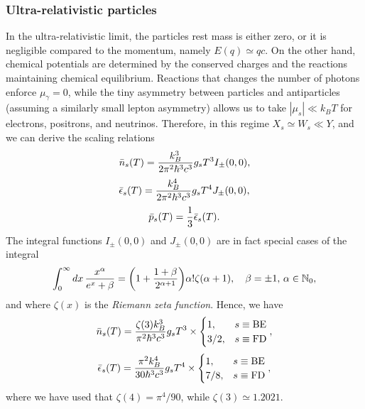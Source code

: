 \subsubsection{Ultra-relativistic particles}
In the ultra-relativistic limit, the particles rest mass is either zero, or it is negligible compared to the momentum, namely $E(q) \simeq qc$. On the other hand, chemical potentials are determined by the conserved charges and the reactions maintaining chemical equilibrium. Reactions that changes the number of photons enforce $\mu_\gamma = 0$, while the tiny asymmetry between particles and antiparticles (assuming a similarly small lepton asymmetry) allows us to take $|\mu_s| \ll k_BT$ for electrons, positrons, and neutrinos. Therefore, in this regime $X_s \simeq W_s \ll Y$, and we can derive the scaling relations
\begin{equation}
    \bar{n}_s(T) = \frac{k_B^3}{2\pi^2\hbar^3c^3}g_sT^3I_\pm(0,0),
\end{equation}
\begin{equation}
    \bar{\epsilon}_s(T) = \frac{k_B^4}{2\pi^2\hbar^3c^3}g_sT^4J_\pm(0,0),
\end{equation}
\begin{equation}
    \bar{p}_s(T) = \frac{1}{3}\bar{\epsilon}_s(T).
\end{equation}
The integral functions $I_\pm(0,0)$ and $J_\pm(0,0)$ are in fact special cases of the integral 
\begin{equation}
    \int_0^\infty dx\,\frac{x^\alpha}{e^x + \beta} = \bigg(1 + \frac{1 + \beta}{2^{\alpha + 1}}\bigg)\alpha!\zeta(\alpha + 1),\quad \beta = \pm 1,\,\alpha \in \mathbb{N}_0,
\end{equation}
and where $\zeta(x)$ is the \emph{Riemann zeta function}. Hence, we have 
\begin{equation}
    \bar{n}_s(T) = \frac{\zeta(3)k_B^3}{\pi^2\hbar^3c^3}g_sT^3\times 
    \begin{cases}
        1, &s \equiv \mathrm{BE} \\
        3/2, &s \equiv \mathrm{FD}
    \end{cases},
\end{equation}
\begin{equation}
    \bar{\epsilon}_s(T) = \frac{\pi^2k_B^4}{30\hbar^3c^3}g_sT^4\times 
    \begin{cases}
        1, &s \equiv \mathrm{BE} \\
        7/8, &s \equiv \mathrm{FD}
    \end{cases},
\end{equation}
where we have used that $\zeta(4) = \pi^4/90$, while $\zeta(3) \simeq 1.2021$. 

